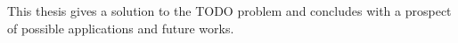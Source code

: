 \thispagestyle{empty}
\vspace*{20mm}

\begin{center}
\textbf{{\abstractname}}
\end{center}

\vspace{10mm}
This thesis gives a solution to the TODO problem and concludes with a prospect of possible applications and future works.

\cleardoublepage{}
